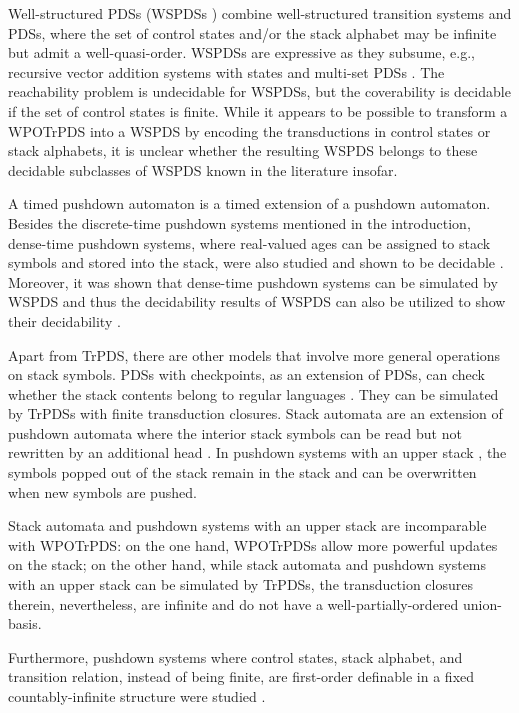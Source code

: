 Well-structured PDSs (WSPDSs \cite{CO13}) combine well-structured transition systems and PDSs, where the set of control states and/or the stack alphabet may be infinite but admit a well-quasi-order. WSPDSs are expressive as they subsume, e.g., recursive vector addition systems with states \cite{BouajjaniE13} and multi-set PDSs \cite{SenV06}. 
The reachability problem is undecidable for WSPDSs, but the coverability is decidable if the set of control states is finite. While it appears to be possible to transform a WPOTrPDS into a WSPDS by encoding the transductions in control states or stack alphabets, it is unclear whether  
the resulting WSPDS belongs to these decidable subclasses of WSPDS known in the literature insofar.

A timed pushdown automaton is a timed extension of a pushdown automaton.  
Besides the discrete-time pushdown systems mentioned in the introduction, 
dense-time pushdown systems, where real-valued ages can be assigned to stack symbols and stored into the stack, were also studied and shown to be decidable \cite{AbdullaAS12}. Moreover, it was shown that dense-time pushdown systems can be simulated by WSPDS and thus the decidability results of WSPDS can also be utilized to show their decidability \cite{CO14}.

Apart from TrPDS, there are other models that involve more general operations on stack symbols. 
PDSs with checkpoints, as an extension of PDSs, can check whether the stack contents belong to regular languages \cite{EsparzaKS03}. They can be simulated by TrPDSs with finite transduction closures.
%
Stack automata are an extension of pushdown automata where %
the interior stack symbols can be read but not rewritten by an additional head \cite{GGH67}. 
%
In pushdown systems with an upper stack \cite{PDT17}, 
the symbols popped out of the stack remain in the stack and can be overwritten when new symbols are pushed.

Stack automata and pushdown systems with an upper stack are incomparable with WPOTrPDS: on the one hand, WPOTrPDSs allow more powerful updates on the stack; on the other hand, while stack automata and pushdown systems with an upper stack can be simulated by TrPDSs, the transduction closures therein, nevertheless, are infinite and do not have a well-partially-ordered union-basis.

Furthermore, pushdown systems where control states, stack alphabet, and transition relation, instead of being finite, are first-order definable in a fixed countably-infinite structure were studied \cite{ClementeL15}.   


